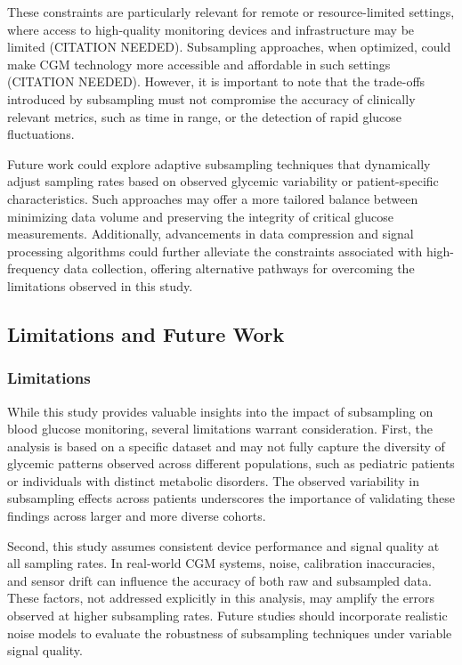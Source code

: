 These constraints are particularly relevant for remote or resource-limited settings, where access to high-quality monitoring devices and infrastructure may be limited (CITATION NEEDED). Subsampling approaches, when optimized, could make CGM technology more accessible and affordable in such settings (CITATION NEEDED). However, it is important to note that the trade-offs introduced by subsampling must not compromise the accuracy of clinically relevant metrics, such as time in range, or the detection of rapid glucose fluctuations.

Future work could explore adaptive subsampling techniques that dynamically adjust sampling rates based on observed glycemic variability or patient-specific characteristics. Such approaches may offer a more tailored balance between minimizing data volume and preserving the integrity of critical glucose measurements. Additionally, advancements in data compression and signal processing algorithms could further alleviate the constraints associated with high-frequency data collection, offering alternative pathways for overcoming the limitations observed in this study.

\subsection{Limitations and Future Work}
\subsubsection{Limitations}
While this study provides valuable insights into the impact of subsampling on blood glucose monitoring, several limitations warrant consideration. First, the analysis is based on a specific dataset and may not fully capture the diversity of glycemic patterns observed across different populations, such as pediatric patients or individuals with distinct metabolic disorders. The observed variability in subsampling effects across patients underscores the importance of validating these findings across larger and more diverse cohorts.

Second, this study assumes consistent device performance and signal quality at all sampling rates. In real-world CGM systems, noise, calibration inaccuracies, and sensor drift can influence the accuracy of both raw and subsampled data. These factors, not addressed explicitly in this analysis, may amplify the errors observed at higher subsampling rates. Future studies should incorporate realistic noise models to evaluate the robustness of subsampling techniques under variable signal quality.

